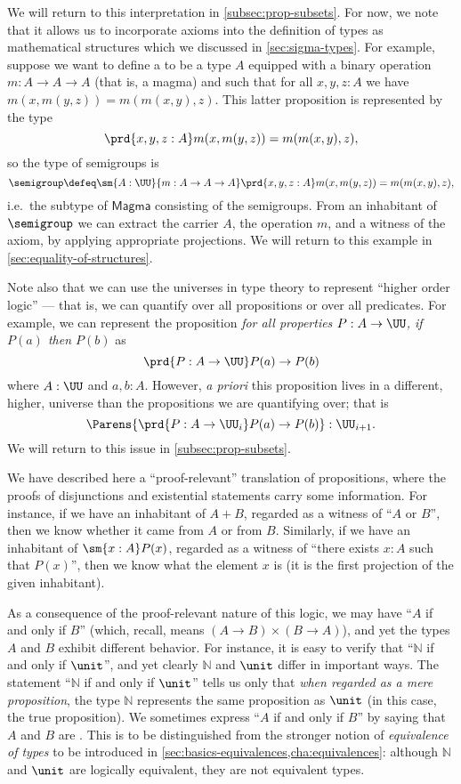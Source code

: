 We will return to this interpretation in \cref{subsec:prop-subsets}.
For now, we note that it allows us to incorporate axioms into the definition of types as mathematical structures which we discussed in \cref{sec:sigma-types}.
For example, suppose we want to define a  to be a type $A$ equipped with a binary operation $m:A\to A\to A$ (that is, a magma) and such that for all $x,y,z:A$ we have $m(x,m(y,z)) = m(m(x,y),z)$.
This latter proposition is represented by the type
\[\prd{x,y,z:A} m(x,m(y,z)) = m(m(x,y),z),\]
so the type of semigroups is
\[ \semigroup \defeq \sm{A:\UU}{m:A\to A\to A} \prd{x,y,z:A} m(x,m(y,z)) = m(m(x,y),z), \]
i.e.\ the subtype of $\mathsf{Magma}$ consisting of the semigroups.
From an inhabitant of $\semigroup$ we can extract the carrier $A$, the operation $m$, and a witness of the axiom, by applying appropriate projections.
We will return to this example in \cref{sec:equality-of-structures}.

Note also that we can use the universes in type theory to represent ``higher order logic'' --- that is, we can quantify over all propositions or over all predicates.
For example, we can represent the proposition \emph{for all properties $P : A \to \UU$, if $P(a)$ then $P(b)$} as
\[ \prd{P : A \to \UU} P(a) \to P(b) \]
where $A : \UU$ and $a,b : A$.
However, \emph{a priori} this proposition lives in a different, higher, universe than the
propositions we are quantifying over; that is
\[ \Parens{\prd{P : A \to \UU_i} P(a) \to P(b)} : \UU_{i+1}. \]
We will return to this issue in \cref{subsec:prop-subsets}.

\mentalpause

We have described here a ``proof-relevant''
%
translation of propositions, where the proofs of disjunctions and existential statements carry some information.
For instance, if we have an inhabitant of $A+B$, regarded as a witness of ``$A$ or $B$'', then we know whether it came from $A$ or from $B$.
Similarly, if we have an inhabitant of $\sm{x:A} P(x)$, regarded as a witness of ``there exists $x:A$ such that $P(x)$'', then we know what the element $x$ is (it is the first projection of the given inhabitant).

As a consequence of the proof-relevant nature of this logic, we may have ``$A$ if and only if $B$'' (which, recall, means $(A\to B)\times (B\to A)$), and yet the types $A$ and $B$ exhibit different behavior.
For instance, it is easy to verify that ``$\mathbb{N}$ if and only if $\unit$'', and yet clearly $\mathbb{N}$ and $\unit$ differ in important ways.
The statement ``$\mathbb{N}$ if and only if $\unit$'' tells us only that \emph{when regarded as a mere proposition}, the type $\mathbb{N}$ represents the same proposition as $\unit$ (in this case, the true proposition).
We sometimes express ``$A$ if and only if $B$'' by saying that $A$ and $B$ are .
%
%
This is to be distinguished from the stronger notion of \emph{equivalence of types} to be introduced in \cref{sec:basics-equivalences,cha:equivalences}:
although $\mathbb{N}$ and $\unit$ are logically equivalent, they are not equivalent types.

